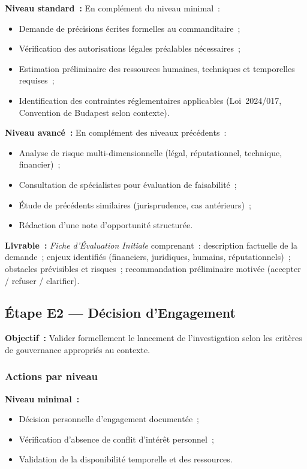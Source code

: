 \textbf{Niveau standard~:} En complément du niveau minimal~:
\begin{itemize}
    \item Demande de précisions écrites formelles au commanditaire~;
    \item Vérification des autorisations légales préalables nécessaires~;
    \item Estimation préliminaire des ressources humaines, techniques et
          temporelles requises~;
    \item Identification des contraintes réglementaires applicables
          (Loi~2024/017, Convention de Budapest selon contexte).
\end{itemize}

\textbf{Niveau avancé~:} En complément des niveaux précédents~:
\begin{itemize}
    \item Analyse de risque multi-dimensionnelle (légal, réputationnel,
          technique, financier)~;
    \item Consultation de spécialistes pour évaluation de faisabilité~;
    \item Étude de précédents similaires (jurisprudence, cas antérieurs)~;
    \item Rédaction d'une note d'opportunité structurée.
\end{itemize}

\textbf{Livrable~:} \textit{Fiche d'Évaluation Initiale} comprenant~:
description factuelle de la demande~; enjeux identifiés (financiers, juridiques,
humains, réputationnels)~; obstacles prévisibles et risques~;
recommandation préliminaire motivée (accepter / refuser / clarifier).

\subsection{Étape E2 --- Décision d'Engagement}

\textbf{Objectif~:} Valider formellement le lancement de l'investigation selon
les critères de gouvernance appropriés au contexte.

\subsubsection*{Actions par niveau}

\textbf{Niveau minimal~:}
\begin{itemize}
    \item Décision personnelle d'engagement documentée~;
    \item Vérification d'absence de conflit d'intérêt personnel~;
    \item Validation de la disponibilité temporelle et des ressources.
\end{itemize}

